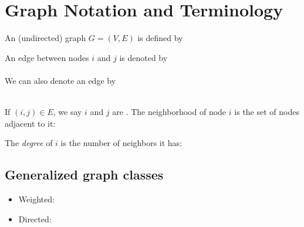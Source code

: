 \documentclass[11  pt]{exam}
\begin{document}
	
	
	
	\section{Graph Notation and Terminology}
	
	An (undirected) graph $G = (V,E)$ is defined by  %
	\vspace{1.5cm}
	
	\noindent An edge between nodes $i$ and $j$ is denoted by \under{4cm}\\ \\
	
	We can also denote an edge by \under{4cm}\\ \\ 
	
	\vspace{8cm}
	
	\noindent If $(i,j) \in E$, we say $i$ and $j$ are \under{3cm}. The neighborhood of node $i$ is the set of nodes adjacent to it:
	
	\vspace{2cm}
	
	\noindent The \emph{degree} of $i$ is the number of neighbors it has: \under{2cm} %
	
	\vspace{1cm}
	
	\newpage 
	
	\subsection{Generalized graph classes}
	\vs{1cm}
	
	\begin{itemize}
		\item Weighted: %
		
		\vs{3cm}
		
		\item Directed: %
		
	\end{itemize}
	
\end{document}
